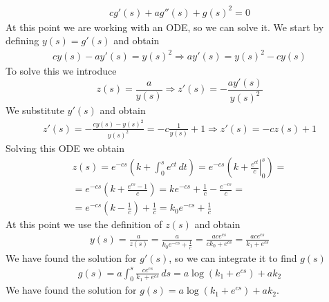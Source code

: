 \begin{enumerate}
\[\begin{split}
            cg'(s) + a g''(s) + g(s)^2 = 0
        \end{split}
    \]
    At this point we are working with an ODE, so we can solve it. We start by defining \(y(s) = g'(s)\) and obtain
    \[
        \begin{split}
            cy(s) - ay'(s) = y(s)^2 \Rightarrow ay'(s) = y(s)^2 - cy(s) 
        \end{split}
    \]
    To solve this we introduce 
    \[
        z(s) = \frac{a}{y(s)} \Rightarrow z'(s) = - \frac{ay'(s)}{y(s)^2} 
    \]
    We substitute \(y'(s)\) and obtain
    \[
        \begin{split}
            z'(s) = - \frac{cy(s) - y(s)^2}{y(s)^2} = -c \frac{1}{y(s)} + 1 \Rightarrow z'(s) = -c z(s) + 1
        \end{split}
    \]
    Solving this ODE we obtain
    \[
        \begin{split}
            z(s) = e^{-cs} \left(k + \int_0^s e^{ct} \, dt\right) = e^{-cs} \left(k + \left. \frac{e^{ct}}{c} \right|_0^s\right) =\\
            = e^{-cs} \left(k + \frac{e^{cs} - 1}{c}\right) = k e^{-cs} + \frac{1}{c} - \frac{e^{-cs}}{c} = \\
            = e^{-cs} \left(k - \frac{1}{c}\right) + \frac{1}{c} = k_0 e^{-cs} + \frac{1}{c}
        \end{split}
    \]
    At this point we use the definition of \(z(s)\) and obtain
    \[
        \begin{split}
            y(s) = \frac{a}{z(s)} = \frac{a}{k_0 e^{-cs} + \frac{1}{c}} = \frac{ac e^{cs}}{c k_0 + e^{cs}} = \frac{ac e^{cs}}{k_1 + e^{cs}}
        \end{split}
    \]
    We have found the solution for \(g'(s)\), so we can integrate it to find \(g(s)\)
    \[
        \begin{split}
            g(s) = a\int_0^s \frac{c e^{cs}}{k_1 + e^{cs}} \, ds = a\log(k_1 + e^{cs}) + ak_2
        \end{split}
    \]
    We have found the solution for \(g(s) = a\log(k_1 + e^{cs}) + ak_2\).
\end{enumerate}

\newpage

